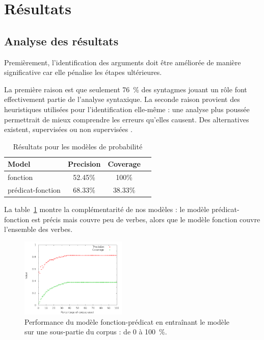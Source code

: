 \section{Résultats}

\subsection{Analyse des résultats}

Premièrement, l'identification des arguments doit être améliorée de manière
significative car elle pénalise les étapes ultérieures.

La première raison est que seulement 76~\% des syntagmes jouant un rôle font
effectivement partie de l'analyse syntaxique.
La seconde raison provient des heuristiques utilisées pour l'identification
elle-même : une analyse plus poussée permettrait de mieux comprendre les
erreurs qu'elles causent. Des alternatives existent, supervisées ou non
supervisées \citep{abend2009unsupervised}.

\begin{table}[ht]
    \centering
    \begin{tabular}{lccc}
        \toprule
        Model          & Precision & Coverage \\
        \midrule
        fonction           & 52.45\% & 100\% \\
        prédicat-fonction & 68.33\% & 38.33\% \\
        \bottomrule
    \end{tabular}
    \caption{\protect\centering\label{table:probabilisticresults}Résultats pour les modèles de probabilité}
\end{table}

La table~\ref{table:probabilisticresults} montre la complémentarité de nos
modèles : le modèle prédicat-fonction est précis mais couvre peu de verbes, alors
que le modèle fonction couvre l'ensemble des verbes.

\begin{figure}[t]
    \centering
    \includegraphics[width=0.45\textwidth]{fig/slot-predicate-percents.png}
    \caption{\label{fig:fonction_predicate}Performance du modèle fonction-prédicat en entraînant le modèle sur une sous-partie du corpus : de 0 à 100~\%.}
\end{figure}

